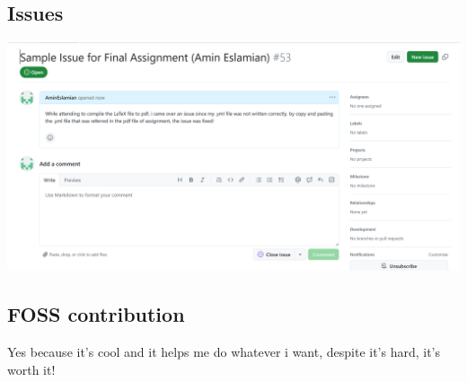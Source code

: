 \documentclass{article}
\begin{document}
\subsection{Issues}
\includegraphics[width=1\textwidth]{issue_screen.png}

\subsection{FOSS contribution}
Yes because it's cool and it helps me do whatever i want, despite it's hard, it's worth it!
\end{document}
